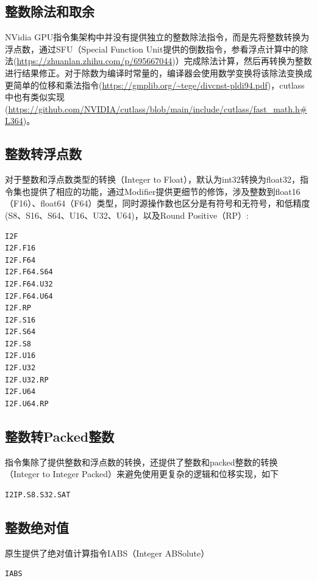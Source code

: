 \subsection{整数除法和取余}

NVidia GPU指令集架构中并没有提供独立的整数除法指令，而是先将整数转换为浮点数，通过SFU（Special Function Unit提供的倒数指令，参看浮点计算中的除法(\url{https://zhuanlan.zhihu.com/p/695667044})）完成除法计算，然后再转换为整数进行结果修正。对于除数为编译时常量的，编译器会使用数学变换将该除法变换成更简单的位移和乘法指令(\url{https://gmplib.org/~tege/divcnst-pldi94.pdf})，cutlass中也有类似实现(\url{https://github.com/NVIDIA/cutlass/blob/main/include/cutlass/fast_math.h#L364})。

\subsection{整数转浮点数}

对于整数和浮点数类型的转换（Integer to Float），默认为int32转换为float32，指令集也提供了相应的功能，通过Modifier提供更细节的修饰，涉及整数到float16（F16）、float64（F64）类型，同时源操作数也区分是有符号和无符号，和低精度(S8、S16、S64、U16、U32、U64)，以及Round Positive（RP）:

\begin{lstlisting}
I2F
I2F.F16
I2F.F64
I2F.F64.S64
I2F.F64.U32
I2F.F64.U64
I2F.RP
I2F.S16
I2F.S64
I2F.S8
I2F.U16
I2F.U32
I2F.U32.RP
I2F.U64
I2F.U64.RP
\end{lstlisting}

\subsection{整数转Packed整数}

指令集除了提供整数和浮点数的转换，还提供了整数和packed整数的转换（Integer to Integer Packed）来避免使用更复杂的逻辑和位移实现，如下

\begin{lstlisting}
I2IP.S8.S32.SAT
\end{lstlisting}

\subsection{整数绝对值}

原生提供了绝对值计算指令IABS（Integer ABSolute）

\begin{lstlisting}
IABS
\end{lstlisting}

